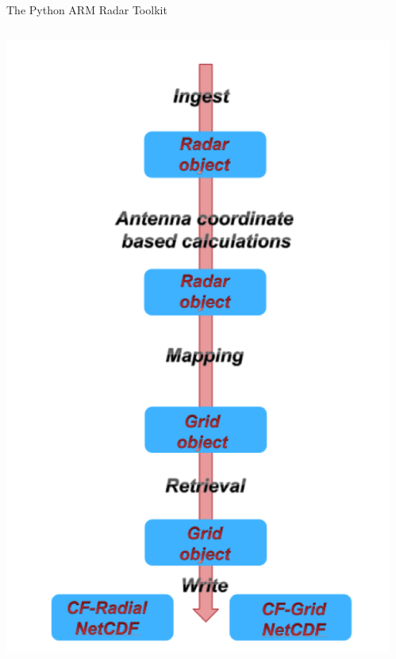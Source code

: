 \documentclass[final]{beamer}
\begin{document}
\begin{frame}{}
\begin{columns}[t]
\begin{column}{.3\linewidth}
\begin{block}{The Python ARM Radar Toolkit}
\begin{columns}[t]
\begin{column}{.4\linewidth}
                       \includegraphics[width=0.9\linewidth]{figures/pyart-flow}\\[1ex]   
                   \end{column}
               \end{columns}
         \end{block}
         

     

    \end{column}
      \begin{column}{.3\linewidth}
  \vfill
 

\end{column}
\end{columns}
\end{frame}
\end{document}
